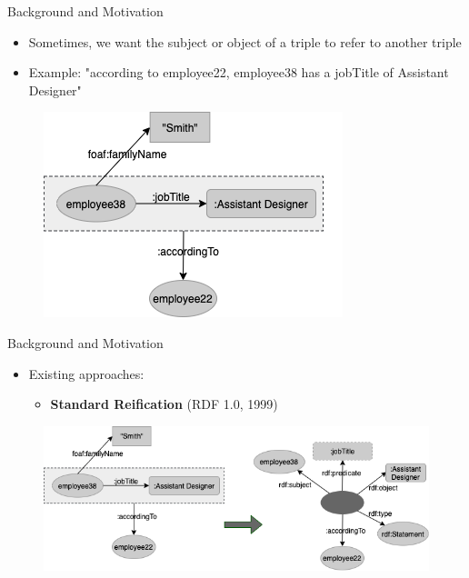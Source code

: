 \documentclass[aspectratio=169]{beamer}
\begin{document}
\begin{frame}{Background and Motivation}
    \begin{itemize}
        \item Sometimes, we want the subject or object of a triple to refer to another triple
        \item Example: "according to employee22, employee38 has a jobTitle of Assistant Designer"
    \end{itemize}
    \begin{figure}
        \centering
        \includegraphics[scale=0.5]{lecture/images/Example-2.png}
    \end{figure}
\end{frame}

\begin{frame}{Background and Motivation}
    \begin{itemize}
        \item Existing approaches:
        \begin{itemize}
            \item \textbf{Standard Reification} (RDF 1.0, 1999)
        \end{itemize}
    \end{itemize}
    \begin{figure}
        \centering
        \includegraphics[scale=0.5]{lecture/images/Example-2-To-Reification.png}
    \end{figure}
\end{frame}
\end{document}
